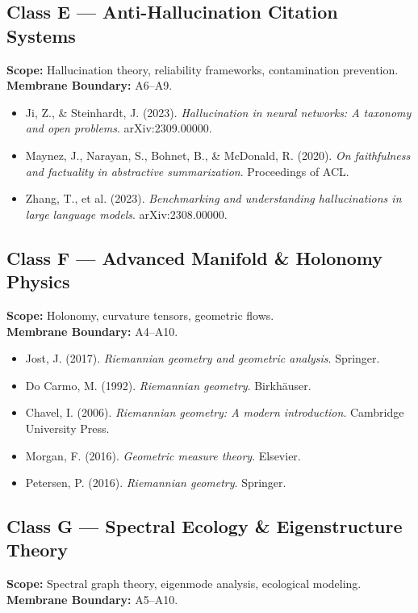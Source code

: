 \subsection*{Class E — Anti-Hallucination Citation Systems}
\textbf{Scope:} Hallucination theory, reliability frameworks, contamination
prevention. \\
\textbf{Membrane Boundary:} A6–A9.

\begin{itemize}
  \item Ji, Z., \& Steinhardt, J. (2023). \textit{Hallucination in neural networks: A taxonomy and open problems}. arXiv:2309.00000.
  \item Maynez, J., Narayan, S., Bohnet, B., \& McDonald, R. (2020). \textit{On faithfulness and factuality in abstractive summarization}. Proceedings of ACL.
  \item Zhang, T., et al. (2023). \textit{Benchmarking and understanding hallucinations in large language models}. arXiv:2308.00000.
\end{itemize}

\subsection*{Class F — Advanced Manifold \& Holonomy Physics}
\textbf{Scope:} Holonomy, curvature tensors, geometric flows. \\
\textbf{Membrane Boundary:} A4–A10.

\begin{itemize}
  \item Jost, J. (2017). \textit{Riemannian geometry and geometric analysis}. Springer.
  \item Do Carmo, M. (1992). \textit{Riemannian geometry}. Birkhäuser.
  \item Chavel, I. (2006). \textit{Riemannian geometry: A modern introduction}. Cambridge University Press.
  \item Morgan, F. (2016). \textit{Geometric measure theory}. Elsevier.
  \item Petersen, P. (2016). \textit{Riemannian geometry}. Springer.
\end{itemize}

\subsection*{Class G — Spectral Ecology \& Eigenstructure Theory}
\textbf{Scope:} Spectral graph theory, eigenmode analysis, ecological modeling. \\
\textbf{Membrane Boundary:} A5–A10.


